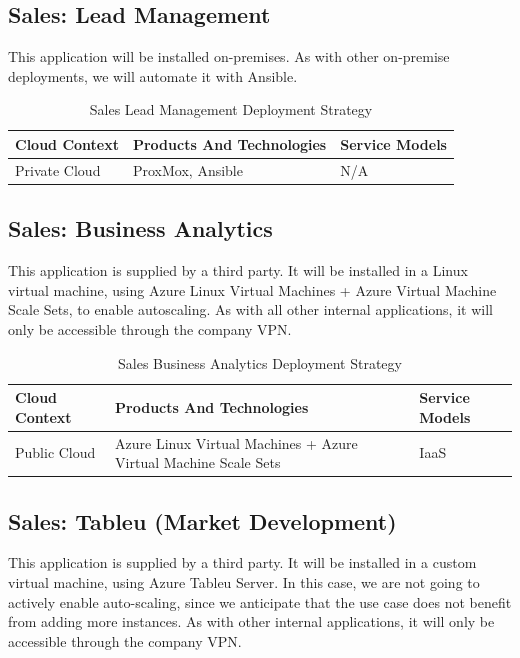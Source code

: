 \documentclass{llncs}
\begin{document}
\subsection{Sales: Lead Management}
This application will be installed on-premises. As with other on-premise deployments, we will automate it with Ansible.
\begin{table}[h!]
    \centering
    \begin{tabular}{lll}
        \hline
        \textbf{Cloud Context} & \textbf{Products And Technologies} & \textbf{Service Models} \\
        \hline
        Private Cloud          & ProxMox, Ansible                   & N/A                     \\
        \hline
    \end{tabular}
    \caption{Sales Lead Management Deployment Strategy}
\end{table}

\subsection{Sales: Business Analytics}
This application is supplied by a third party. It will be installed in a Linux virtual machine, using Azure Linux Virtual Machines + Azure Virtual Machine Scale Sets, to enable autoscaling.
As with all other internal applications, it will only be accessible through the company VPN.\\

\begin{table}[h!]
    \centering
    \begin{tabular}{lll}
        \hline
        \textbf{Cloud Context} & \textbf{Products And Technologies}                              & \textbf{Service Models} \\
        \hline
        Public Cloud           & Azure Linux Virtual Machines + Azure Virtual Machine Scale Sets & IaaS                    \\
    \end{tabular}
    \caption{Sales Business Analytics Deployment Strategy}
\end{table}

\subsection{Sales: Tableu (Market Development)}
This application is supplied by a third party. It will be installed in a custom virtual machine, using Azure Tableu Server.
In this case, we are not going to actively enable auto-scaling, since we anticipate that the use case does not benefit from adding more instances.
As with other internal applications, it will only be accessible through the company VPN.\\
\end{document}
